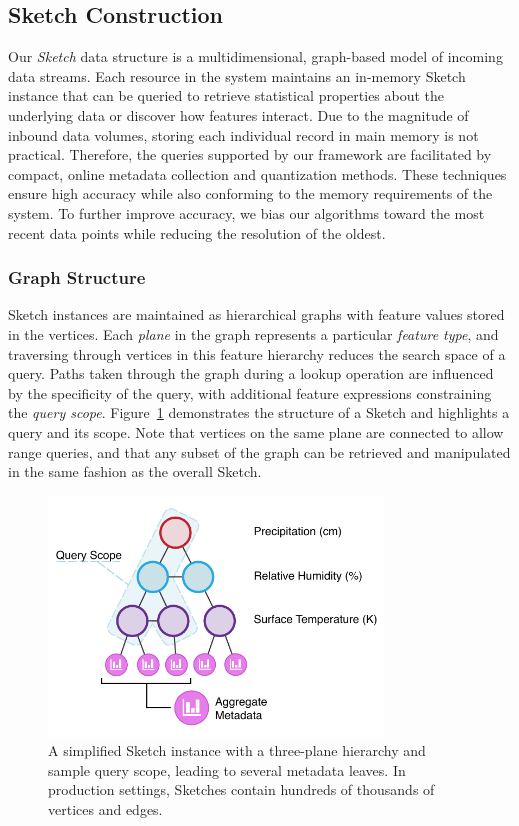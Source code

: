 \subsection{Sketch Construction}
\label{sec:sketch}
Our \emph{Sketch} data structure is a multidimensional, graph-based model of incoming data streams. Each resource in the system maintains an in-memory Sketch instance that can be queried to retrieve statistical properties about the underlying data or discover how features interact. Due to the magnitude of inbound data volumes, storing each individual record in main memory is not practical. Therefore, the queries supported by our framework are facilitated by compact, online metadata collection and quantization methods. These techniques ensure high accuracy while also conforming to the memory requirements of the system. To further improve accuracy, we bias our algorithms toward the most recent data points while reducing the resolution of the oldest.

\subsubsection{Graph Structure}
Sketch instances are maintained as hierarchical graphs with feature values stored in the vertices. Each \emph{plane} in the graph represents a particular \emph{feature type}, and traversing through vertices in this feature hierarchy reduces the search space of a query. Paths taken through the graph during a lookup operation are influenced by the specificity of the query, with additional feature expressions constraining the \emph{query scope}. Figure~\ref{fig:sketch} demonstrates the structure of a Sketch and highlights a query and its scope. Note that vertices on the same plane are connected to allow range queries, and that any subset of the graph can be retrieved and manipulated in the same fashion as the overall Sketch.

\begin{figure}
    \centerline{\includegraphics[width=3.5in]{figures/sketch.pdf}}
    \caption{A simplified Sketch instance with a three-plane hierarchy and sample query scope, leading to several metadata leaves. In production settings, Sketches contain hundreds of thousands of vertices and edges.}
    \label{fig:sketch}
\end{figure}


